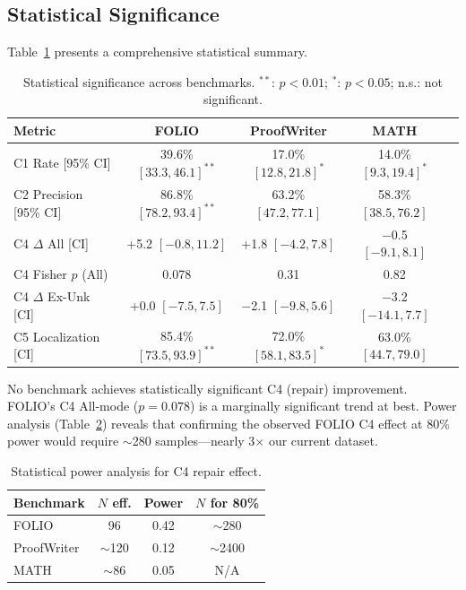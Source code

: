 \documentclass[11pt,a4paper]{article}
\begin{document}
\subsection{Statistical Significance}
\label{sec:stats}

Table~\ref{tab:stats} presents a comprehensive statistical summary.

\begin{table}[t]
\centering
\small
\caption{Statistical significance across benchmarks. $^{**}$: $p < 0.01$; $^*$: $p < 0.05$; n.s.: not significant.}
\label{tab:stats}
\begin{tabular}{lcccc}
\toprule
\textbf{Metric} & \textbf{FOLIO} & \textbf{ProofWriter} & \textbf{MATH} \\
\midrule
C1 Rate [95\% CI] & 39.6\% $[33.3, 46.1]^{**}$ & 17.0\% $[12.8, 21.8]^{*}$ & 14.0\% $[9.3, 19.4]^{*}$ \\
C2 Precision [95\% CI] & 86.8\% $[78.2, 93.4]^{**}$ & 63.2\% $[47.2, 77.1]$ & 58.3\% $[38.5, 76.2]$ \\
C4 $\Delta$ All [CI] & +5.2 $[-0.8, 11.2]$ & +1.8 $[-4.2, 7.8]$ & $-$0.5 $[-9.1, 8.1]$ \\
C4 Fisher $p$ (All) & 0.078 & 0.31 & 0.82 \\
C4 $\Delta$ Ex-Unk [CI] & +0.0 $[-7.5, 7.5]$ & $-$2.1 $[-9.8, 5.6]$ & $-$3.2 $[-14.1, 7.7]$ \\
C5 Localization [CI] & 85.4\% $[73.5, 93.9]^{**}$ & 72.0\% $[58.1, 83.5]^{*}$ & 63.0\% $[44.7, 79.0]$ \\
\bottomrule
\end{tabular}
\end{table}

No benchmark achieves statistically significant C4 (repair) improvement. FOLIO's C4 All-mode ($p=0.078$) is a marginally significant trend at best. Power analysis (Table~\ref{tab:power}) reveals that confirming the observed FOLIO C4 effect at 80\% power would require $\sim$280 samples---nearly 3$\times$ our current dataset.

\begin{table}[t]
\centering
\small
\caption{Statistical power analysis for C4 repair effect.}
\label{tab:power}
\begin{tabular}{lccc}
\toprule
\textbf{Benchmark} & \textbf{$N$ eff.} & \textbf{Power} & \textbf{$N$ for 80\%} \\
\midrule
FOLIO & 96 & 0.42 & $\sim$280 \\
ProofWriter & $\sim$120 & 0.12 & $\sim$2400 \\
MATH & $\sim$86 & 0.05 & N/A \\
\bottomrule
\end{tabular}
\end{table}
\end{document}

